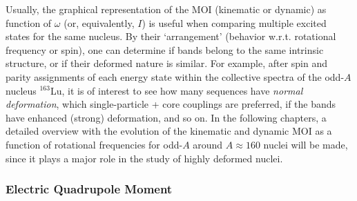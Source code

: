 Usually, the graphical representation of the MOI (kinematic or dynamic) as function of $\omega$ (or, equivalently, $I$) is useful when comparing multiple excited states for the same nucleus. By their `arrangement' (behavior w.r.t. rotational frequency or spin), one can determine if bands belong to the same intrinsic structure, or if their deformed nature is similar. For example, after spin and parity assignments of each energy state within the collective spectra of the odd-$A$ nucleus $^{163}$Lu, it is of interest to see how many sequences have \emph{normal deformation}, which single-particle + core couplings are preferred, if the bands have enhanced (strong) deformation, and so on. In the following chapters, a detailed overview with the evolution of the kinematic and dynamic MOI as a function of rotational frequencies for odd-$A$ around $A\approx 160$ nuclei will be made, since it plays a major role in the study of highly deformed nuclei. %

\subsubsection{Electric Quadrupole Moment}
\label{intro-EM-chapter3}

